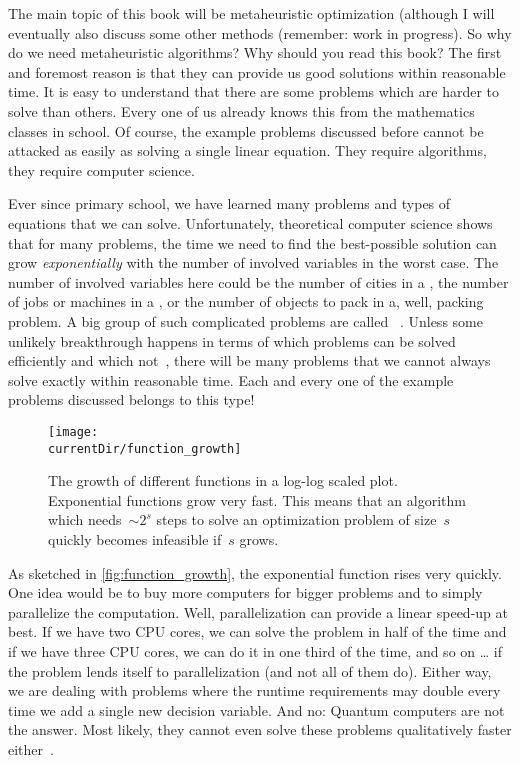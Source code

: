 %
%
The main topic of this book will be metaheuristic optimization (although I will eventually also discuss some other methods (remember: work in progress).
So why do we need metaheuristic algorithms?
Why should you read this book?%
%
%
\label{sec:approximationOfTheOptimum}%
%
The first and foremost reason is that they can provide us good solutions within reasonable time.
It is easy to understand that there are some problems which are harder to solve than others.
Every one of us already knows this from the mathematics classes in school.
Of course, the example problems discussed before cannot be attacked as easily as solving a single linear equation.
They require algorithms, they require computer science.

Ever since primary school, we have learned many problems and types of equations that we can solve.
Unfortunately, theoretical computer science shows that for many problems, the time we need to find the best-possible solution can grow \emph{exponentially} with the number of involved variables in the worst case.
The number of involved variables here could be the number of cities in a , the number of jobs or machines in a , or the number of objects to pack in a, well, packing problem.
A big group of such complicated problems are called \NPhard~\cite{LLRKS1993SASAAC,CPW1998AROMSCAAA}.
Unless some unlikely breakthrough happens in terms of which problems can be solved efficiently and which not~\cite{C1971TCOTPP,K1972RACP}, there will be many problems that we cannot always solve exactly within reasonable time.
Each and every one of the example problems discussed belongs to this type!

\begin{figure}%
\centering%
\texttt{[image: \\currentDir/function\_growth]}%
\caption{The growth of different functions in a log-log scaled plot. Exponential functions grow very fast. This means that an algorithm which needs~$\sim 2^s$ steps to solve an optimization problem of size~$s$ quickly becomes infeasible if~$s$ grows.}%
\label{fig:function_growth}%
\end{figure}

As sketched in \autoref{fig:function_growth}, the exponential function rises very quickly.
One idea would be to buy more computers for bigger problems and to simply parallelize the computation.
Well, parallelization can provide a linear speed-up at best.
If we have two CPU cores, we can solve the problem in half of the time and if we have three CPU cores, we can do it in one third of the time, and so on {\dots} if the problem lends itself to parallelization (and not all of them do).
Either way, we are dealing with problems where the runtime requirements may double every time we add a single new decision variable.
And no: Quantum computers are not the answer.
Most likely, they cannot even solve these problems qualitatively faster either~\cite{A2008TLOQC}.

